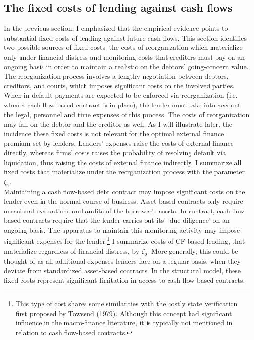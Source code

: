 \documentclass[12pt]{article}
\begin{document}
\subsection{The fixed costs of lending against cash flows \label{sec:fixed costs}}
In the previous section, I emphasized that the empirical evidence points to substantial fixed costs of lending against future cash flows. This section identifies two possible sources of fixed costs: the costs of reorganization which materialize only under financial distress and monitoring costs that creditors must pay on an ongoing basis in order to maintain a realistic on the debtors' going-concern value. \vspace{3mm} \\
The reorganization process involves a lengthy negotiation between debtors, creditors, and courts, which imposes significant costs on the involved parties. When in-default payments are expected to be enforced via reorganization (i.e. when a cash flow-based contract is in place), the lender must take into account the legal, personnel and time expenses of this process. The costs of reorganization may fall on the debtor and the creditor as well. As I will illustrate later, the incidence these fixed costs is not relevant for the optimal external finance premium set by lenders. Lenders' expenses raise the costs of external finance directly, whereas firms' costs raises the probability of resolving default via liquidation, thus raising the costs of external finance indirectly. I summarize all fixed costs that materialize under the reorganization process with the parameter $\zeta_1$. \vspace{3mm} \\
Maintaining a cash flow-based debt contract may impose significant costs on the lender even in the normal course of business. Asset-based contracts only require occasional evaluations and audits of the borrower's assets. In contrast, cash flow-based contracts require that the lender carries out its' `due diligence' on an ongoing basis. The apparatus to maintain this monitoring activity may impose significant expenses for the lender.\footnote{This type of cost shares some similarities with the costly state verification first proposed by Towsend (1979). Although this concept had significant influence in the macro-finance literature, it is typically not mentioned in relation to cash flow-based contracts.} I summarize costs of CF-based lending, that materialize regardless of financial distress, by $\zeta_2$. More generally, this could be thought of as all additional expenses lenders face on a regular basis, when they deviate from standardized asset-based contracts. In the structural model, these fixed costs represent significant limitation in access to cash flow-based contracts. 
\end{document}
